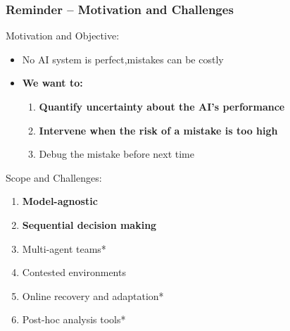\documentclass[handout]{beamer}
\begin{document}
\begin{frame}
    \frametitle{Reminder -- Motivation and Challenges}
    Motivation and Objective:
    \begin{itemize}
    \item No AI system is perfect,mistakes can be costly
    \item \textbf{We want to:}
        \begin{enumerate}
        \item \textbf{Quantify uncertainty about the AI's performance}
        \item \textbf{Intervene when the risk of a mistake is too high}
        \item Debug the mistake before next time
        \end{enumerate}
    \end{itemize}
    
    Scope and Challenges:
    \begin{enumerate}
    \item \textbf{Model-agnostic}
    \item \textbf{Sequential decision making}
    \item Multi-agent teams*
    \item Contested environments
    \item Online recovery and adaptation*
    \item Post-hoc analysis tools*
    \end{enumerate}

\end{frame}
\end{document}
